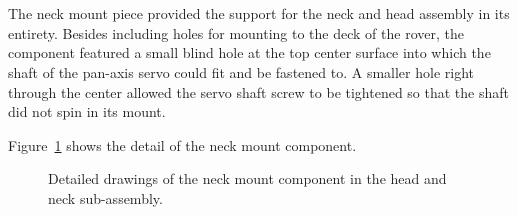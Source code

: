       \\\\
        The neck mount piece provided the support for the neck and head assembly in its entirety. Besides including holes for mounting to the deck of the rover, the component featured a small blind hole at the top center surface into which the shaft of the pan-axis servo could fit and be fastened to. A smaller hole right through the center allowed the servo shaft screw to be tightened so that the shaft did not spin in its mount.
        
        Figure~\ref{fig:mechDesign-neckMount} shows the detail of the neck mount component.

        \begin{figure}[h!]
        \centering
        \caption[Detailed drawings of the neck mount component in the head and neck sub-assembly.]{Detailed drawings of the neck mount component in the head and neck sub-assembly.}
        \label{fig:mechDesign-neckMount}
        \end{figure}

